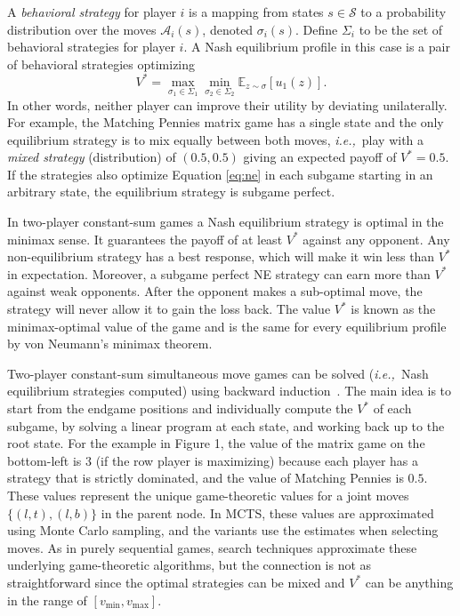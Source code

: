 \documentclass[conference]{IEEEtran}
\newcommand{\bE}{\mathbb{E}}
\newcommand{\cA}{\mathcal{A}}
\newcommand{\cS}{\mathcal{S}}
\newcommand{\ie}{{\it i.e.,}~}
\begin{document}
A {\it behavioral strategy} for player $i$ is a mapping from states $s \in \cS$
to a probability distribution over the moves $\cA_i(s)$, denoted $\sigma_i(s)$. 
Define $\Sigma_i$ to be the set of behavioral 
strategies for player $i$. A Nash equilibrium profile in this case is a pair of behavioral strategies optimizing
\begin{equation}\label{eq:ne}
V^* = \max_{\sigma_1 \in \Sigma_1} \min_{\sigma_2 \in \Sigma_2} \bE_{z \sim \sigma}[u_1(z)].
\end{equation}
In other words, neither player can improve their utility by deviating unilaterally. 
For example, the Matching Pennies matrix game has a single state and the only equilibrium strategy is to mix equally between both moves, \ie play with a {\it mixed strategy} (distribution) of $(0.5, 0.5)$ giving an expected payoff of $V^* = 0.5$. 
If the strategies also optimize Equation \ref{eq:ne} in each subgame starting in an arbitrary state, the equilibrium strategy is subgame perfect.

In two-player constant-sum games a Nash equilibrium strategy is optimal in the minimax sense. It guarantees the payoff of at least $V^*$ against any opponent. Any 
non-equilibrium strategy has a best response, which will make it win less than $V^*$ in expectation. Moreover, a subgame perfect NE strategy can earn more 
than $V^*$ against weak opponents. After the opponent makes a sub-optimal move, the strategy will never allow it to gain the loss back. 
The value $V^*$ is known as the minimax-optimal value of the game and is the same for every equilibrium profile by von Neumann's minimax theorem.

Two-player constant-sum simultaneous move games can be solved (\ie Nash equilibrium strategies computed) using backward 
induction~\cite{Ross71Goofspiel,Buro03OshiZumo,Rhoads12Computer}. The main idea is to start from the 
endgame positions and individually compute the $V^*$ of each subgame, by solving a linear program at each state, and working back up to the root state.
For the example in Figure 1, the value of the matrix game on the bottom-left is $3$ (if the row player is maximizing) because each player has a 
strategy that is strictly dominated, and the 
value of Matching Pennies is $0.5$. These values represent the unique game-theoretic values for a joint moves $\{ (l,t), (l,b) \}$ in the parent node.
In MCTS, these values are approximated using Monte Carlo sampling, and the variants use the estimates when selecting moves.
As in purely sequential games, search techniques approximate these underlying game-theoretic algorithms, but  
the connection is not as straightforward since the optimal strategies can be mixed and $V^*$ can be anything 
in the range of $[v_{\min}, v_{\max}]$.
\end{document}
